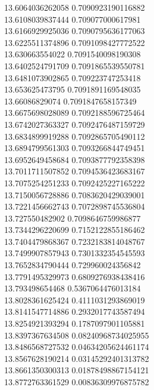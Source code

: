 {13.6064036262058 0.7090923190116882 \\
13.6108039837444 0.709077000617981 \\
13.6166929925036 0.7090795636177063 \\
13.6225511374896 0.7091098427772522 \\
13.630663554022 0.7091540098190308 \\
13.6402524791709 0.7091865539550781 \\
13.6481073902865 0.709223747253418 \\
13.653625473795 0.7091891169548035 \\
13.66086829074 0.7091847658157349 \\
13.6675698028089 0.7092188596725464 \\
13.6742027363327 0.7092476487159729 \\
13.6834899919288 0.7092865705490112 \\
13.6894799561303 0.7093266844749451 \\
13.6952649458684 0.7093877792358398 \\
13.7011711507852 0.7094536423683167 \\
13.7075254251233 0.7092425227165222 \\
13.7150056728886 0.7083620429039001 \\
13.7221456662743 0.7072898745536804 \\
13.727550482902 0.7098646759986877 \\
13.7344296220699 0.7152122855186462 \\
13.7404479868367 0.7232183814048767 \\
13.7499907857943 0.7301332354545593 \\
13.7652834790444 0.729960024356842 \\
13.7791495329973 0.6809276938438416 \\
13.793498654468 0.5367064476013184 \\
13.8028361625424 0.4111031293869019 \\
13.8141547714886 0.2932017743587494 \\
13.8254921393294 0.1787097901105881 \\
13.8397367634508 0.08240968734025955 \\
13.8486568727532 0.04634205624461174 \\
13.8567628190214 0.03145292401313782 \\
13.8661350300313 0.01878498867154121 \\
13.8772763361529 0.00836309976875782 \\
}
